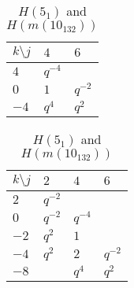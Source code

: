 \begin{table}[t]
\begin{minipage}{.5\linewidth}
\centering
\begin{tabular}{l|ll}
$k \setminus j$	& $4$	& $6$ \\
\hline
$4$	& $q^{-4}$	&  \\
$0$	& $1$	& $q^{-2}$ \\
$-4$	& $q^4$	& $q^2$ \\
\end{tabular}
\vspace{2.5em}
\end{minipage}%
\begin{minipage}{.5\linewidth}
\centering
\begin{tabular}{l|lll}
$k \setminus j$	& $2$    & $4$	& $6$ \\
\hline
$2$ & $q^{-2}$ &  &  \\
$0$ & $q^{-2}$ & $q^{-4}$ &  \\
$-2$ & $q^{2}$ & $1$ &  \\
$-4$ & $q^{2}$ & $2$ & $q^{-2}$ \\
$-8$ &  & $q^{4}$ & $q^{2}$ \\
\end{tabular}
\end{minipage} 
\caption{$H(5_1)$ and $H(m(10_{132}))$}
\label{table:compare}
\end{table}


